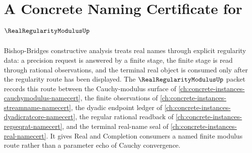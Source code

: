 \chapter{A Concrete Naming Certificate for $\RealRegularityModulusUp$}
\label{ch:concrete-instances-real-regularity-modulus-namecert}

Bishop-Bridges constructive analysis treats real names through explicit regularity data: a precision request is answered by a finite stage, the finite stage is read through rational observations, and the terminal real object is consumed only after the regularity route has been displayed. The $\RealRegularityModulusUp$ packet records this route between the Cauchy-modulus surface of \autoref{ch:concrete-instances-cauchymodulus-namecert}, the finite observations of \autoref{ch:concrete-instances-streamname-namecert}, the dyadic endpoint ledger of \autoref{ch:concrete-instances-dyadicratcore-namecert}, the regular rational readback of \autoref{ch:concrete-instances-regseqrat-namecert}, and the terminal real-name seal of \autoref{ch:concrete-instances-real-namecert}. It gives Real and Completion consumers a named finite modulus route rather than a parameter echo of Cauchy convergence.

